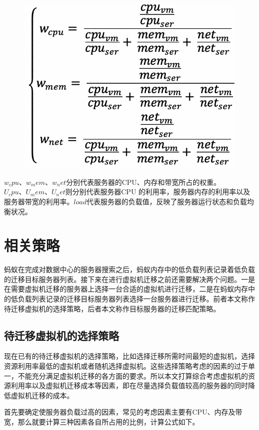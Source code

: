  \begin{figure}[ht]
  \centering
  \includegraphics{./Figure/IMG_Chap3_8.png}
  \caption{}\label{Fig:chap3_8}
\end{figure}

$w_cpu 、w_mem 、w_net $分别代表服务器的CPU、内存和带宽所占的权重。$U_cpu 、U_mem 、U_net $则分别代表服务器CPU 的利用率，服务器内存的利用率以及服务器带宽的利用率。$load $代表服务器的负载值，反映了服务器运行状态和负载均衡状况。

\section{相关策略}
蚂蚁在完成对数据中心的服务器搜索之后，蚂蚁内存中的低负载列表记录着低负载的迁移目标服务器列表。接下来在进行虚拟机迁移之前还需要解决两个问题。一是在需要虚拟机迁移的服务器上选择一台合适的虚拟机进行迁移，二是在蚂蚁内存中的低负载列表记录的迁移目标服务器列表选择一台服务器进行迁移。前者本文称作待迁移虚拟机的选择策略，后者本文称作目标服务器的迁移匹配策略。

\subsection{待迁移虚拟机的选择策略}
现在已有的待迁移虚拟机的选择策略，比如选择迁移所需时间最短的虚拟机，选择资源利用率最低的虚拟机或者随机选择虚拟机。这些选择策略考虑的因素的过于单一，不能充分满足虚拟机迁移的各方面的要求。所以本文打算综合考虑虚拟机的资源利用率以及虚拟机迁移成本等因素，即在尽量选择负载值较高的服务器的同时降低虚拟机迁移的成本。

首先要确定使服务器负载过高的因素，常见的考虑因素主要有CPU、内存及带宽，那么就要计算三种因素各自所占用的比例，计算公式如下。

